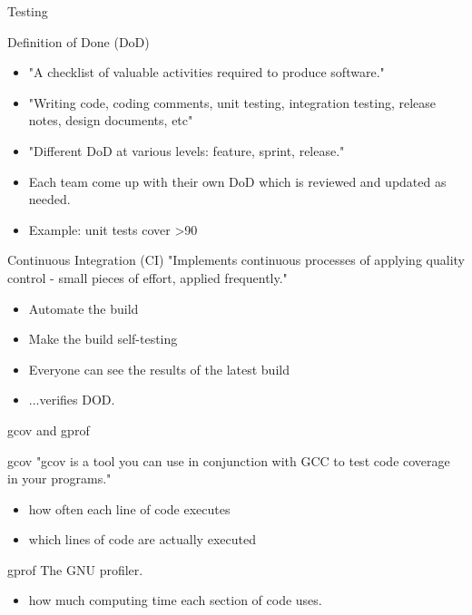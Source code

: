 \documentclass{beamer}
\begin{document}

\begin{frame}{Testing}

\begin{block}{Definition of Done (DoD)}
\small
\begin{itemize}
  \item "A checklist of valuable activities required to produce software." \cite{dod}
  \item "Writing code, coding comments, unit testing, integration testing, release notes, design documents, etc"
  \item "Different DoD at various levels: feature, sprint, release."
  \item Each team come up with their own DoD which is reviewed and updated as needed.
  \item Example: unit tests cover >90%
\end{itemize}
\end{block}

\begin{block}{Continuous Integration (CI)}
\small
"Implements continuous processes of applying quality control - small pieces of effort, applied frequently." \cite{ci}

\begin{itemize}
  \item Automate the build
  \item Make the build self-testing
  \item Everyone can see the results of the latest build
  \item ...verifies DOD.
\end{itemize}
\end{block}

\end{frame}


\begin{frame}{gcov and gprof}

\begin{block}{gcov}
\small
"gcov is a tool you can use in conjunction with GCC to test code coverage in your programs." \cite{gcov}

\begin{itemize}
  \item how often each line of code executes
  \item which lines of code are actually executed
\end{itemize}
\end{block}

\begin{block}{gprof}
\small
The GNU profiler. \cite{gprof}

\begin{itemize}
  \item how much computing time each section of code uses.
\end{itemize}
\end{block}

\end{frame}
\end{document}
